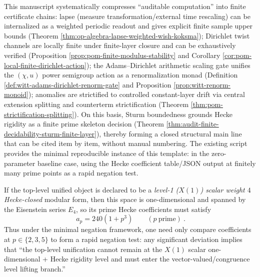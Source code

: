 \begin{remark}\label{rem:audit-summary-lapse-dirichlet-adams-sturm}
This manuscript systematically compresses ``auditable computation'' into finite certificate chains: lapse (measure transformation/external time rescaling) can be internalized as a weighted periodic readout and gives explicit finite sample upper bounds (Theorem \ref{thm:op-algebra-lapse-weighted-wish-koksma}); Dirichlet twist channels are locally finite under finite-layer closure and can be exhaustively verified (Proposition \ref{prop:pom-finite-modulus-stability} and Corollary \ref{cor:pom-local-finite-dirichlet-action}); the Adams--Dirichlet arithmetic scaling gate unifies the \((\chi,u)\) power semigroup action as a renormalization monad (Definition \ref{def:witt-adams-dirichlet-renorm-gate} and Proposition \ref{prop:witt-renorm-monoid}); anomalies are strictified to controlled constant-layer drift via central extension splitting and counterterm strictification (Theorem \ref{thm:pom-strictification-splitting}).
On this basis, Sturm boundedness grounds Hecke rigidity as a finite prime skeleton decision (Theorem \ref{thm:audit-finite-decidability-sturm-finite-layer}), thereby forming a closed structural main line that can be cited item by item, without manual numbering.
The existing script \texttt{} provides the minimal reproducible instance of this template: in the zero-parameter baseline case, using the Hecke coefficient table/JSON output at finitely many prime points as a rapid negation test.
\end{remark}
\begin{corollary}\label{cor:hecke-e4-three-prime-refutation}
If the top-level unified object is declared to be a \emph{level-1 (\(X(1)\)) scalar weight \(4\) Hecke-closed} modular form,
then this space is one-dimensional and spanned by the Eisenstein series \(E_4\), so its prime Hecke coefficients must satisfy
\[
\boxed{\ a_p=240(1+p^3)\qquad(p\ \text{prime})\ }.
\]
Thus under the minimal negation framework, one need only compare coefficients at \(p\in\{2,3,5\}\) to form a rapid negation test:
any significant deviation implies that ``the top-level unification cannot remain at the \(X(1)\) scalar one-dimensional + Hecke rigidity level and must enter the vector-valued/congruence level lifting branch.''
\end{corollary}
